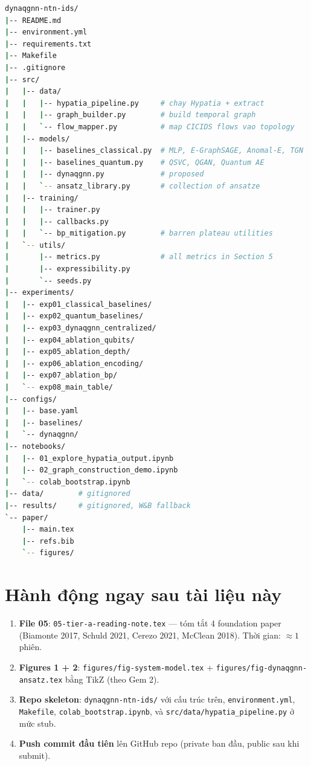\documentclass[11pt,a4paper]{article}
\begin{document}
\begin{lstlisting}[language=bash]
dynaqgnn-ntn-ids/
|-- README.md
|-- environment.yml
|-- requirements.txt
|-- Makefile
|-- .gitignore
|-- src/
|   |-- data/
|   |   |-- hypatia_pipeline.py     # chay Hypatia + extract
|   |   |-- graph_builder.py        # build temporal graph
|   |   `-- flow_mapper.py          # map CICIDS flows vao topology
|   |-- models/
|   |   |-- baselines_classical.py  # MLP, E-GraphSAGE, Anomal-E, TGN
|   |   |-- baselines_quantum.py    # QSVC, QGAN, Quantum AE
|   |   |-- dynaqgnn.py             # proposed
|   |   `-- ansatz_library.py       # collection of ansatze
|   |-- training/
|   |   |-- trainer.py
|   |   |-- callbacks.py
|   |   `-- bp_mitigation.py        # barren plateau utilities
|   `-- utils/
|       |-- metrics.py              # all metrics in Section 5
|       |-- expressibility.py
|       `-- seeds.py
|-- experiments/
|   |-- exp01_classical_baselines/
|   |-- exp02_quantum_baselines/
|   |-- exp03_dynaqgnn_centralized/
|   |-- exp04_ablation_qubits/
|   |-- exp05_ablation_depth/
|   |-- exp06_ablation_encoding/
|   |-- exp07_ablation_bp/
|   `-- exp08_main_table/
|-- configs/
|   |-- base.yaml
|   |-- baselines/
|   `-- dynaqgnn/
|-- notebooks/
|   |-- 01_explore_hypatia_output.ipynb
|   |-- 02_graph_construction_demo.ipynb
|   `-- colab_bootstrap.ipynb
|-- data/        # gitignored
|-- results/     # gitignored, W&B fallback
`-- paper/
    |-- main.tex
    |-- refs.bib
    `-- figures/
\end{lstlisting}

\section{Hành động ngay sau tài liệu này}

\begin{enumerate}
  \item \textbf{File 05}: \texttt{05-tier-a-reading-note.tex} --- tóm tắt 4 foundation paper (Biamonte 2017, Schuld 2021, Cerezo 2021, McClean 2018). Thời gian: $\approx 1$ phiên.
  \item \textbf{Figures 1 + 2}: \texttt{figures/fig-system-model.tex} + \texttt{figures/fig-dynaqgnn-ansatz.tex} bằng TikZ (theo Gem 2).
  \item \textbf{Repo skeleton}: \texttt{dynaqgnn-ntn-ids/} với cấu trúc trên, \texttt{environment.yml}, \texttt{Makefile}, \texttt{colab\_bootstrap.ipynb}, và \texttt{src/data/hypatia\_pipeline.py} ở mức stub.
  \item \textbf{Push commit đầu tiên} lên GitHub repo (private ban đầu, public sau khi submit).
\end{enumerate}
\end{document}
